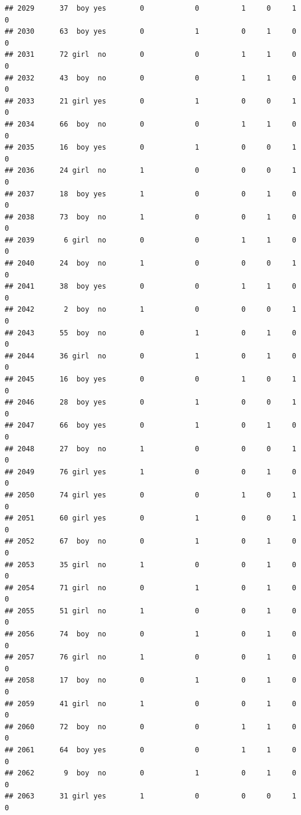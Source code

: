 \documentclass[man]{apa6}
\begin{document}
\begin{verbatim}
## 2029      37  boy yes        0            0          1     0     1     0
## 2030      63  boy yes        0            1          0     1     0     0
## 2031      72 girl  no        0            0          1     1     0     0
## 2032      43  boy  no        0            0          1     1     0     0
## 2033      21 girl yes        0            1          0     0     1     0
## 2034      66  boy  no        0            0          1     1     0     0
## 2035      16  boy yes        0            1          0     0     1     0
## 2036      24 girl  no        1            0          0     0     1     0
## 2037      18  boy yes        1            0          0     1     0     0
## 2038      73  boy  no        1            0          0     1     0     0
## 2039       6 girl  no        0            0          1     1     0     0
## 2040      24  boy  no        1            0          0     0     1     0
## 2041      38  boy yes        0            0          1     1     0     0
## 2042       2  boy  no        1            0          0     0     1     0
## 2043      55  boy  no        0            1          0     1     0     0
## 2044      36 girl  no        0            1          0     1     0     0
## 2045      16  boy yes        0            0          1     0     1     0
## 2046      28  boy yes        0            1          0     0     1     0
## 2047      66  boy yes        0            1          0     1     0     0
## 2048      27  boy  no        1            0          0     0     1     0
## 2049      76 girl yes        1            0          0     1     0     0
## 2050      74 girl yes        0            0          1     0     1     0
## 2051      60 girl yes        0            1          0     0     1     0
## 2052      67  boy  no        0            1          0     1     0     0
## 2053      35 girl  no        1            0          0     1     0     0
## 2054      71 girl  no        0            1          0     1     0     0
## 2055      51 girl  no        1            0          0     1     0     0
## 2056      74  boy  no        0            1          0     1     0     0
## 2057      76 girl  no        1            0          0     1     0     0
## 2058      17  boy  no        0            1          0     1     0     0
## 2059      41 girl  no        1            0          0     1     0     0
## 2060      72  boy  no        0            0          1     1     0     0
## 2061      64  boy yes        0            0          1     1     0     0
## 2062       9  boy  no        0            1          0     1     0     0
## 2063      31 girl yes        1            0          0     0     1     0

\end{verbatim}
\end{document}
